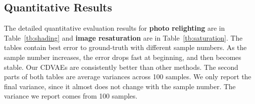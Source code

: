 \documentclass[10pt,twocolumn,letterpaper]{article}
\begin{document}
\subsection{Quantitative Results}
The detailed quantitative evaluation results for \textbf{photo relighting} are in
Table~\ref{tb:shading} and  \textbf{image resaturation} are in Table~\ref{tb:saturation}.
The tables contain best error to ground-truth with different sample numbers. As the sample 
number increases, the error drops fast at beginning, and then becomes stable. Our CDVAEs 
are consistently better than other methods. The second parts of both tables are average 
variances across 100 samples. We only report the final variance, since it almost does not change 
with the sample number. The variance we report comes from 100 samples. 

\begin{table*}
\vspace{2mm}
\caption{Photo relighting results. First part is best error to ground truth with different sample numbers; second part is variance, which 
is stable with different sample numbers. (all results need $\times 10^{-2}$)}
\label{tb:shading}
\end{table*}
\end{document}
